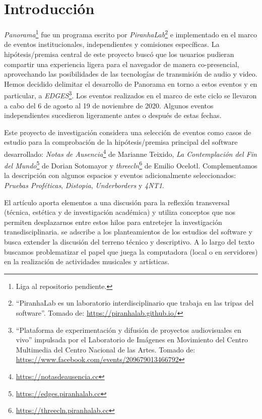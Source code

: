 
\section*{Introducción}


\textit{Panorama}\footnote{Liga al repositorio pendiente.} fue un programa escrito por \textit{PiranhaLab}\footnote{``PiranhaLab es un laboratorio interdisciplinario que trabaja en las tripas del software''. Tomado de: \url{https://piranhalab.github.io/}} e implementado en el marco de eventos institucionales, independientes y comisiones específicas. La hipótesis/premisa central de este proyecto buscó que los usuarios pudieran compartir una experiencia ligera para el navegador de manera co-presencial, aprovechando las posibilidades de las tecnologías de transmisión de audio y video. %
Hemos decidido delimitar el desarrollo de Panorama en torno a estos eventos y en particular, a \textit{EDGES}\footnote{ ``Plataforma de experimentación y difusión de proyectos audiovisuales en vivo'' impulsada por el Laboratorio de Imágenes en Movimiento del Centro Multimedia del Centro Nacional de las Artes. Tomado de: \url{https://www.facebook.com/events/209679013466792}}. Los eventos realizados en el marco de este ciclo se llevaron a cabo del 6 de agosto al 19 de noviembre de 2020. Algunos eventos independientes sucedieron ligeramente antes o después de estas fechas. 	

Este proyecto de investigación considera una selección de eventos como casos de estudio para la comprobación de la hipótesis/premisa principal del software desarrollado: \textit{Notas de Ausencia}\footnote{\url{https://notasdeausencia.cc}} de Marianne Teixido, \textit{La Contemplación del Fin del Mundo}\footnote{\url{https://edges.piranhalab.cc}} de Dorian Sotomayor y \textit{threecln}\footnote{\url{https://threecln.piranhalab.cc}} de Emilio Ocelotl. Complementamos la descripción con algunos espacios y eventos adicionalmente seleccionados: \textit{Pruebas Proféticas}, \textit{Distopia}, \textit{Underborders} y \textit{4NT1}. %

El artículo aporta elementos a una discusión para la reflexión transversal (técnica, estética y  de investigación académica) y utiliza conceptos que nos permiten desplazarnos entre estos hilos para entretejer la investigación transdisciplinaria. se adscribe a los planteamientos de los estudios del software y busca extender la discusión del terreno técnico y descriptivo. A lo largo del texto buscamos problematizar el papel que juega la computadora (local o en servidores) en la realización de actividades musicales y artísticas.

